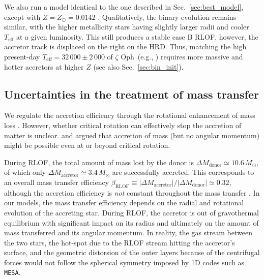 \documentclass[twocolumn,twocolappendix,trackchanges]{aastex63}
\DeclareRobustCommand{\Secref}[1]{Sec.~\ref{#1}}
\newcommand{\zoph}{$\zeta$ Oph}
\begin{document}
We also run a model identical to the one described in
\Secref{sec:best_model}, except with $Z=Z_\odot=0.0142$
\citep{asplund:09}. Qualitatively, the binary evolution remains
similar, with the higher metallicity stars having slightly larger
radii and cooler $T_\mathrm{eff}$ at a given luminosity. This still
produces a stable case B RLOF, however, the accretor track is
displaced on the right on the HRD. Thus, matching the high present-day
$T_\mathrm{eff}=32\,000\pm2\,000$ of \zoph\ (e.g., ) requires more
massive and hotter accretors at higher $Z$ (see also \Secref{sec:bin_init}).


\subsection{Uncertainties in the treatment of mass transfer}
\label{sec:bin_param}

We regulate the accretion efficiency through the rotational
enhancement of mass loss \citep[e.g.,][]{langer:98}.
However, whether critical rotation can effectively stop the accretion
of matter is unclear. \cite{popham:91} and \cite{paczynski:91}
argued that accretion of mass (but no angular momentum) might be
possible even at or beyond critical rotation.

During RLOF, the total amount of mass lost by the donor is
$\Delta M_\mathrm{donor} \simeq 10.6\,M_\odot$, of which only
$\Delta M_\mathrm{accretor}\simeq 3.4\,M_\odot$ are successfully
accreted. This corresponds to an overall mass transfer efficiency
$\beta_\mathrm{RLOF}\equiv |\Delta M_\mathrm{accretor}|/|\Delta M_\mathrm{donor}| \simeq 0.32$,
although the accretion efficiency is \emph{not} constant throughout
the mass transfer \citep[e.g.,][]{vanrensbergen:06}. In our models,
the mass transfer efficiency depends on the radial and rotational
evolution of the accreting star. During RLOF, the accretor is out of
gravothermal equilibrium with significant impact on its radius and
ultimately on the amount of mass transferred and its angular
momentum. In reality, the gas stream between the two stars, the
hot-spot due to the RLOF stream hitting the accretor's surface, and
the geometric distorsion of the outer layers because of the
centrifugal forces would not follow the spherical symmetry imposed by
1D codes such as \texttt{MESA}.
\end{document}
